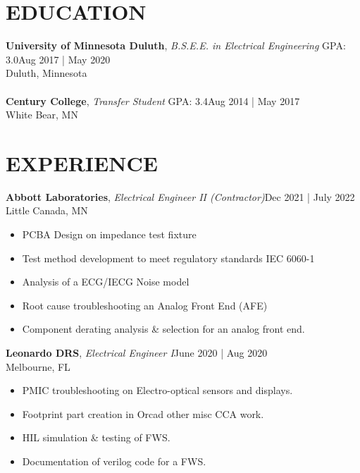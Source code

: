 \documentclass[line,margin]{res}
\begin{document}
\address{machlerjohn@gmail.com | (651) 200-9766 | Minneapolis, MN | machler.xyz}
\begin{resume}
	\vspace{-5mm}
	        
	
	\section{EDUCATION}
	\textbf{University of Minnesota Duluth}, {\sl B.S.E.E. in Electrical Engineering} GPA: 3.0\hfill Aug 2017 | May 2020\\Duluth, Minnesota\\\\
	\textbf{Century College}, {\sl Transfer Student} GPA: 3.4\hfill Aug 2014 | May 2017\\White Bear, MN
	\section{EXPERIENCE}
	\textbf{Abbott Laboratories}, {\sl Electrical Engineer II (Contractor)}\hfill Dec 2021 | July 2022\\Little Canada, MN\\\begin{itemize} \itemsep 3pt
	\item PCBA Design on impedance test fixture
	\item Test method development to meet regulatory standards IEC 6060-1
	\item Analysis of a ECG/IECG Noise model
	\item Root cause troubleshooting an Analog Front End (AFE)
	\item Component derating analysis \& selection for an analog front end.
	\end{itemize}
	\textbf{Leonardo DRS}, {\sl Electrical Engineer I}\hfill June 2020 | Aug 2020\\Melbourne, FL\\\begin{itemize} \itemsep 3pt
	\item PMIC troubleshooting on Electro-optical sensors and displays.
	\item Footprint part creation in Orcad other misc CCA work.
	\item HIL simulation \& testing of FWS.
	\item Documentation of verilog code for a FWS.
	\end{itemize}

\end{resume}
\end{document}
